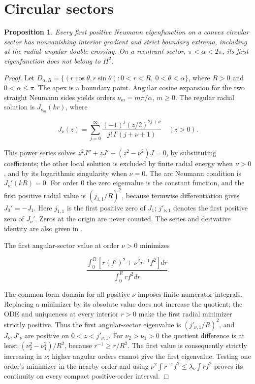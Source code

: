 \documentclass[11pt]{article}
\newtheorem{proposition}[theorem]{Proposition}
\theoremstyle{definition}
\theoremstyle{remark}
\numberwithin{equation}{section}
\begin{document}
\section{Circular sectors}\label{sec:sectors}
\begin{proposition}\label{prop:sectors}
Every first positive Neumann eigenfunction on a convex circular sector has nonvanishing interior gradient and strict boundary extrema, including at the radial--angular double crossing. On a reentrant sector, $\pi<\alpha<2\pi$, its first eigenfunction does not belong to $H^2$.
\end{proposition}
\begin{proof}
Let $D_{\alpha,R}=\{(r\cos\theta,r\sin\theta):0<r<R,\ 0<\theta<\alpha\}$, where $R>0$ and $0<\alpha\le\pi$. The apex is a boundary point. Angular cosine expansion for the two straight Neumann sides yields orders $\nu_m=m\pi/\alpha$, $m\ge0$. The regular radial solution is $J_{\nu_m}(kr)$, where

\begin{equation}\label{eq:src-9-01}
J_\nu(z)=\sum_{j=0}^\infty\frac{(-1)^j(z/2)^{2j+\nu}}{j!\,\Gamma(j+\nu+1)}\quad(z>0).
\end{equation}

This power series solves $z^2J''+zJ'+(z^2-\nu^2)J=0$, by substituting coefficients; the other local solution is excluded by finite radial energy when $\nu>0$, and by its logarithmic singularity when $\nu=0$. The arc Neumann condition is $J_\nu'(kR)=0$. For order 0 the zero eigenvalue is the constant function, and the first positive radial value is $(j_{1,1}/R)^2$, because termwise differentiation gives $J_0'=-J_1$. Here $j_{1,1}$ is the first positive zero of $J_1$; $j'_{\nu,1}$ denotes the first positive zero of $J_\nu'$. Zeros at the origin are never counted. The series and derivative identity are also given in \cite[Equations~10.2.2 and 10.6.3]{DLMF}.

The first angular-sector value at order $\nu>0$ minimizes

\begin{equation}\label{eq:src-9-02}
\frac{\int_0^R[r(f')^2+\nu^2r^{-1}f^2]dr}{\int_0^Rrf^2dr}.
\end{equation}

The common form domain for all positive $\nu$ imposes finite numerator integrals. Replacing a minimizer by its absolute value does not increase the quotient; the ODE and uniqueness at every interior $r>0$ make the first radial minimizer strictly positive. Thus the first angular-sector eigenvalue is $(j'_{\nu,1}/R)^2$, and $J_\nu,J'_\nu$ are positive on $0<z<j'_{\nu,1}$. For $\nu_2>\nu_1>0$ the quotient difference is at least $(\nu_2^2-\nu_1^2)/R^2$, because $r^{-1}\ge r/R^2$. The first value is consequently strictly increasing in $\nu$; higher angular orders cannot give the first eigenvalue. Testing one order's minimizer in the nearby order and using $\nu^2\int r^{-1}f^2\le\lambda_\nu\int rf^2$ proves its continuity on every compact positive-order interval.


\end{proof}
\end{document}
